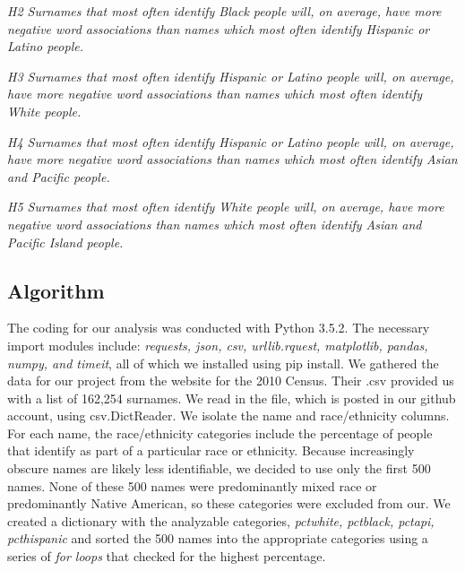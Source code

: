 \documentclass[sigconf]{acmart}
\begin{document}
\vspace{2mm}

{\em H2 Surnames that most often identify Black people will, on average, have more negative word associations than names which most often identify Hispanic or Latino people.} \\
\vspace{2mm}

{\em H3 Surnames that most often identify Hispanic or Latino people will, on average, have more negative word associations than names which most often identify White people.} \\

\vspace{2mm}

{\em H4 Surnames that most often identify Hispanic or Latino people will, on average, have more negative word associations than names which most often identify Asian and Pacific people.} \\

\vspace{2mm}

{\em H5 Surnames that most often identify White people will, on average, have more negative word associations than names which most often identify Asian and Pacific Island people.} \\
\vspace{2mm}


\subsection{Algorithm}

The coding for our analysis was conducted with Python 3.5.2. The necessary import modules include: {\em requests, json, csv, urllib.rquest, matplotlib, pandas, numpy, and timeit}, all of which we installed using pip install. We gathered the data for our project from the website for the 2010 Census. Their .csv provided us with a list of 162,254 surnames. We read in the file, which is posted in our github account, using csv.DictReader. We isolate the name and race/ethnicity columns. For each name, the race/ethnicity categories include the percentage of people that identify as part of a particular race or ethnicity. Because increasingly obscure names are likely less identifiable, we decided to use only the first 500 names. None of these 500 names were predominantly mixed race or predominantly Native American, so these categories were excluded from our. We created a dictionary with the analyzable categories, {\em pctwhite, pctblack, pctapi, pcthispanic} and sorted the 500 names into the appropriate categories using a series of {\em for loops} that checked for the highest percentage. 
\end{document}

